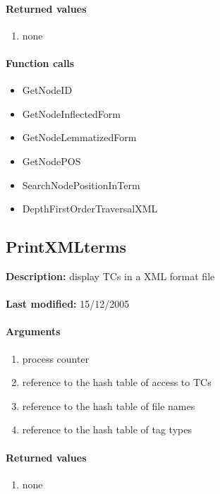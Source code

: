 \paragraph{Returned values}
\begin{enumerate}
\item none
\end{enumerate}

\paragraph{Function calls}
\begin{itemize}
\item GetNodeID
\item GetNodeInflectedForm
\item GetNodeLemmatizedForm
\item GetNodePOS
\item SearchNodePositionInTerm
\item DepthFirstOrderTraversalXML
\end{itemize}

\subsection{PrintXMLterms}
\textbf{Description:} display TCs in a XML format file\\
\\\textbf{Last modified:} 15/12/2005

\paragraph{Arguments}
\begin{enumerate}
\item process counter
\item reference to the hash table of access to TCs
\item reference to the hash table of file names
\item reference to the hash table of tag types
\end{enumerate}

\paragraph{Returned values}
\begin{enumerate}
\item none
\end{enumerate}


